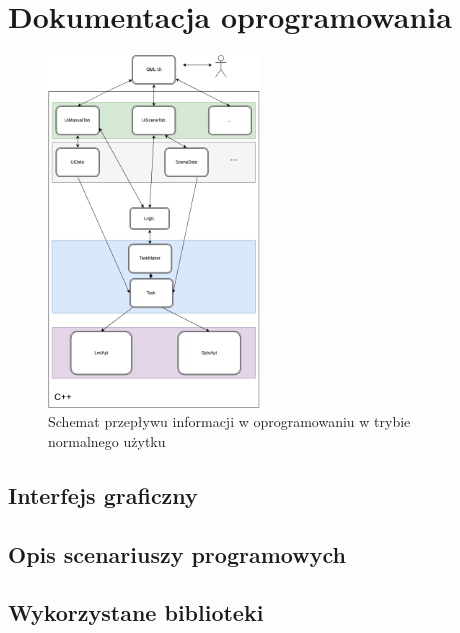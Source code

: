 \documentclass[12pt, eng, twoside, openany, final]{mgr}
\begin{document}
            \section{Dokumentacja oprogramowania}
                \begin{figure}[H]
                \begin{center}
                    \includegraphics[width=0.5\textwidth]{inz_diag.png}
                    \caption{Schemat przepływu informacji w oprogramowaniu w trybie normalnego użytku}
                \end{center}
                \end{figure}
                
                \subsection{Interfejs graficzny}
                \subsection{}
                \subsection{Opis scenariuszy programowych}
                \subsection{Wykorzystane biblioteki}
                \subsection{}
            
\end{document}
